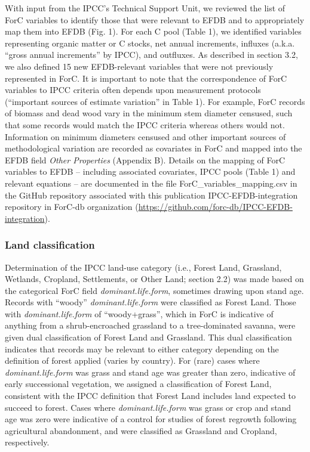 \documentclass[, manuscript]{copernicus}
\begin{document}
With input from the IPCC's Technical Support Unit, we reviewed the list
of ForC variables to identify those that were relevant to EFDB and to
appropriately map them into EFDB (Fig. 1). For each C pool (Table 1), we
identified variables representing organic matter or C stocks, net annual
increments, influxes (a.k.a. ``gross annual increments'' by IPCC), and
outfluxes. As described in section 3.2, we also defined 15 new
EFDB-relevant variables that were not previously represented in ForC. It
is important to note that the correspondence of ForC variables to IPCC
criteria often depends upon measurement protocols (``important sources
of estimate variation'' in Table 1). For example, ForC records of
biomass and dead wood vary in the minimum stem diameter censused, such
that some records would match the IPCC criteria whereas others would
not. Information on minimum diameters censused and other important
sources of methodological variation are recorded as covariates in ForC
and mapped into the EFDB field \emph{Other Properties} (Appendix B).
Details on the mapping of ForC variables to EFDB -- including associated
covariates, IPCC pools (Table 1) and relevant equations
\citep{ipcc_2006_2006} -- are documented in the file
ForC\_variables\_mapping.csv in the GitHub repository associated with
this publication IPCC-EFDB-integration repository in ForC-db
organization (\url{https://github.com/forc-db/IPCC-EFDB-integration}).

\subsubsection{Land classification}

Determination of the IPCC land-use category (i.e., Forest Land,
Grassland, Wetlands, Cropland, Settlements, or Other Land; section 2.2)
was made based on the categorical ForC field \emph{dominant.life.form},
sometimes drawing upon stand age. Records with ``woody''
\emph{dominant.life.form} were classified as Forest Land. Those with
\emph{dominant.life.form} of ``woody+grass'', which in ForC is
indicative of anything from a shrub-encroached grassland to a
tree-dominated savanna, were given dual classification of Forest Land
and Grassland. This dual classification indicates that records may be
relevant to either category depending on the definition of forest
applied (varies by country). For (rare) cases where
\emph{dominant.life.form} was grass and stand age was greater than zero,
indicative of early successional vegetation, we assigned a
classification of Forest Land, consistent with the IPCC definition that
Forest Land includes land expected to succeed to forest. Cases where
\emph{dominant.life.form} was grass or crop and stand age was zero were
indicative of a control for studies of forest regrowth following
agricultural abandonment, and were classified as Grassland and Cropland,
respectively.
\end{document}
